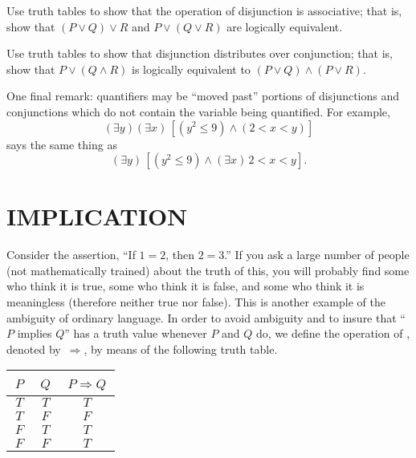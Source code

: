 \begin{prob} Use truth tables to show that the operation of disjunction is associative; that is,
show that $(P \lor Q) \lor R$ and $P \lor (Q \lor R)$ are logically equivalent.
\end{prob}

\begin{prob}\label{prob_disj_conj} Use truth tables to show that disjunction distributes over
conjunction; that is, show that $P \lor (Q \land R)$ is logically equivalent to $(P \lor Q)
\land (P \lor R)$.
\end{prob}

One final remark: quantifiers may be ``moved past'' portions of disjunctions and conjunctions
which do not contain the variable being quantified.  For example,
  \[ (\exists y)(\exists x)\,[(y^2 \le 9) \land (2<x<y)] \]
says the same thing as
  \[ (\exists y)\,[(y^2 \le 9) \land (\exists x)\,2<x<y]. \]







\section{IMPLICATION}\label{implication} Consider the assertion, ``If $1=2$, then $2=3$.''
If you ask a large number of people (not mathematically trained) about the truth of this,
you will probably find some who think it is true, some who think it is false, and some
who think it is meaningless (therefore neither true nor false).  This is another example
of the ambiguity of ordinary language. In order to avoid ambiguity and to insure that
``$P$ implies $Q$'' has a truth value whenever $P$ and $Q$ do, we define the operation of
, denoted
by~$\Rightarrow$, by means of the
following truth table.
 \begin{center}
  \begin{tabular}{|c|c||c|}\hline
        \,$P$\,    &    \,$Q$\,    &   \,$P \Rightarrow Q$\,   \\
    \hline\hline
          $T$      &      $T$      &         $T$            \\
    \hline
          $T$      &      $F$      &         $F$            \\
    \hline
          $F$      &      $T$      &         $T$            \\
    \hline
          $F$      &      $F$      &         $T$            \\
    \hline
  \end{tabular}
 \end{center}

